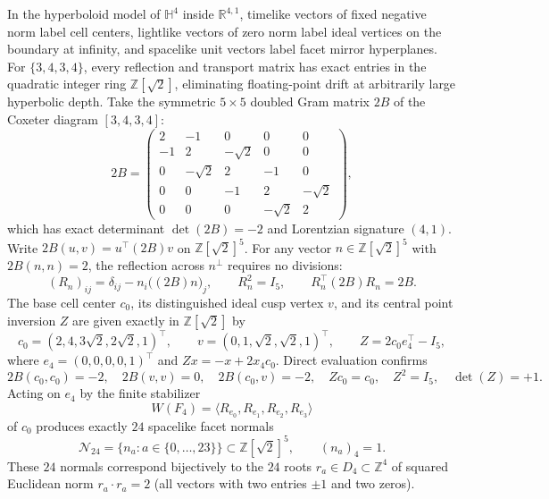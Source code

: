 In the hyperboloid model of $\mathbb{H}^4$ inside $\mathbb{R}^{4,1}$, timelike vectors of fixed negative norm label cell centers, lightlike vectors of zero norm label ideal vertices on the boundary at infinity, and spacelike unit vectors label facet mirror hyperplanes. For $\{3,4,3,4\}$, every reflection and transport matrix has exact entries in the quadratic integer ring $\mathbb{Z}[\sqrt{2}]$, eliminating floating-point drift at arbitrarily large hyperbolic depth. Take the symmetric $5 \times 5$ doubled Gram matrix $2B$ of the Coxeter diagram $[3,4,3,4]$:
\begin{equation}
\label{eq:twice-gram}
2B =
\begin{pmatrix}
2 & -1 & 0 & 0 & 0 \\
-1 & 2 & -\sqrt{2} & 0 & 0 \\
0 & -\sqrt{2} & 2 & -1 & 0 \\
0 & 0 & -1 & 2 & -\sqrt{2} \\
0 & 0 & 0 & -\sqrt{2} & 2
\end{pmatrix},
\end{equation}
which has exact determinant $\det(2B) = -2$ and Lorentzian signature $(4,1)$. Write $2B(u,v) = u^{\top}(2B)v$ on $\mathbb{Z}[\sqrt{2}]^5$. For any vector $n \in \mathbb{Z}[\sqrt{2}]^5$ with $2B(n,n) = 2$, the reflection across $n^{\perp}$ requires no divisions:
\begin{equation}
\label{eq:reflection}
(R_n)_{ij} = \delta_{ij} - n_i\bigl((2B)n\bigr)_j, \qquad R_n^2 = I_5, \qquad R_n^{\top}(2B)R_n = 2B.
\end{equation}
The base cell center $c_0$, its distinguished ideal cusp vertex $v$, and its central point inversion $Z$ are given exactly in $\mathbb{Z}[\sqrt{2}]$ by
\begin{equation}
\label{eq:center-cusp}
c_0 = (2, 4, 3\sqrt{2}, 2\sqrt{2}, 1)^{\top}, \qquad v = (0, 1, \sqrt{2}, \sqrt{2}, 1)^{\top}, \qquad Z = 2 c_0 e_4^{\top} - I_5,
\end{equation}
where $e_4 = (0,0,0,0,1)^{\top}$ and $Z x = -x + 2 x_4 c_0$. Direct evaluation confirms
\begin{equation}
\label{eq:base-identities}
2B(c_0, c_0) = -2, \quad 2B(v,v) = 0, \quad 2B(c_0, v) = -2, \quad Z c_0 = c_0, \quad Z^2 = I_5, \quad \det(Z) = +1.
\end{equation}
Acting on $e_4$ by the finite stabilizer
\begin{equation}
\label{eq:wf4-gens}
W(F_4) = \langle R_{e_0}, R_{e_1}, R_{e_2}, R_{e_3}\rangle
\end{equation}
of $c_0$ produces exactly $24$ spacelike facet normals
\begin{equation}
\label{eq:facet-normals}
\mathcal{N}_{24} = \bigl\{n_a : a \in \{0,\dots,23\}\bigr\} \subset \mathbb{Z}[\sqrt{2}]^5, \qquad (n_a)_4 = 1.
\end{equation}
These $24$ normals correspond bijectively to the $24$ roots $r_a \in D_4 \subset \mathbb{Z}^4$ of squared Euclidean norm $r_a \cdot r_a = 2$ (all vectors with two entries $\pm 1$ and two zeros).


